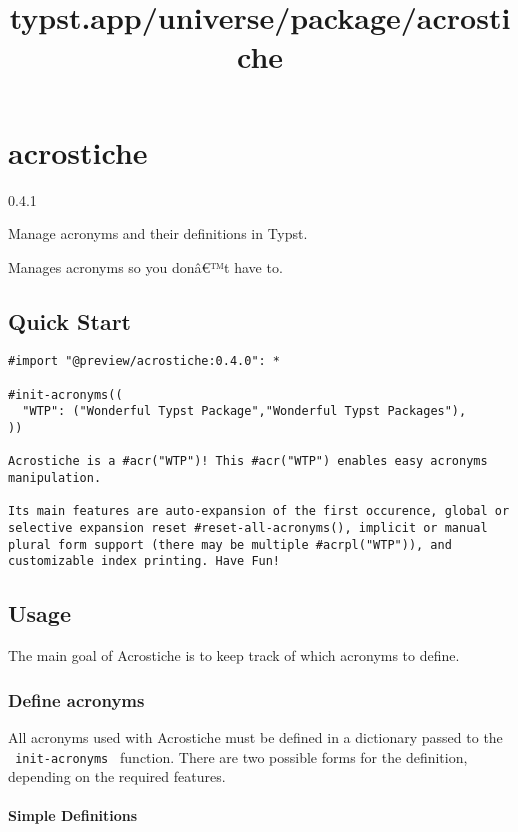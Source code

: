 \title{typst.app/universe/package/acrostiche}

\label{banner}
\section{acrostiche}\label{acrostiche}

{ 0.4.1 }

Manage acronyms and their definitions in Typst.

\label{readme}
Manages acronyms so you donâ€™t have to.

\subsection{Quick Start}\label{quick-start}

\begin{verbatim}
#import "@preview/acrostiche:0.4.0": *

#init-acronyms((
  "WTP": ("Wonderful Typst Package","Wonderful Typst Packages"),
))

Acrostiche is a #acr("WTP")! This #acr("WTP") enables easy acronyms manipulation.

Its main features are auto-expansion of the first occurence, global or selective expansion reset #reset-all-acronyms(), implicit or manual plural form support (there may be multiple #acrpl("WTP")), and customizable index printing. Have Fun!
\end{verbatim}

\subsection{Usage}\label{usage}

The main goal of Acrostiche is to keep track of which acronyms to
define.

\subsubsection{Define acronyms}\label{define-acronyms}

All acronyms used with Acrostiche must be defined in a dictionary passed
to the \texttt{\ init-acronyms\ } function. There are two possible forms
for the definition, depending on the required features.

\paragraph{Simple Definitions}\label{simple-definitions}

